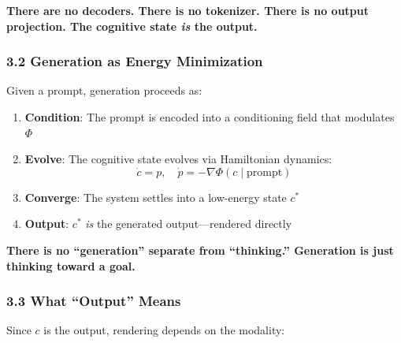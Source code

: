 \documentclass[
  11pt,
  a4paper,
]{article}
\providecommand{\tightlist}{%
  \setlength{\itemsep}{0pt}\setlength{\parskip}{0pt}}
\begin{document}
\textbf{There are no decoders. There is no tokenizer. There is no output
projection. The cognitive state \emph{is} the output.}

\subsubsection{3.2 Generation as Energy
Minimization}\label{generation-as-energy-minimization}

Given a prompt, generation proceeds as:

\begin{enumerate}
\def\labelenumi{\arabic{enumi}.}
\tightlist
\item
  \textbf{Condition}: The prompt is encoded into a conditioning field
  that modulates \(\Phi\)
\item
  \textbf{Evolve}: The cognitive state evolves via Hamiltonian dynamics:
  \[
  \dot{c} = p, \quad \dot{p} = -\nabla\Phi(c \mid \text{prompt})
  \]
\item
  \textbf{Converge}: The system settles into a low-energy state \(c^*\)
\item
  \textbf{Output}: \(c^*\) \emph{is} the generated output---rendered
  directly
\end{enumerate}

\textbf{There is no ``generation'' separate from ``thinking.''
Generation is just thinking toward a goal.}

\subsubsection{3.3 What ``Output'' Means}\label{what-output-means}

Since \(c\) is the output, rendering depends on the modality:
\end{document}
